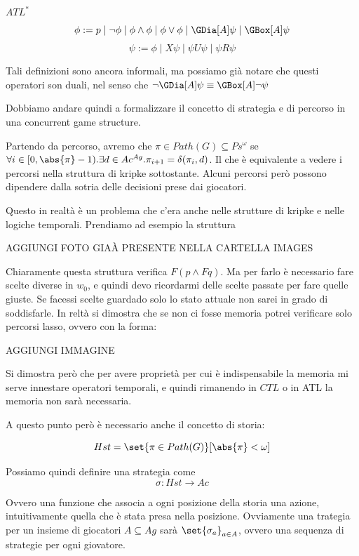 \begin{definition}{\(ATL^*\)}
  \[\phi := p \mid \neg \phi \mid \phi \land \phi \mid \phi \lor \phi \mid \GDia[A]\psi \mid \GBox[A] \psi\]
  \[\psi := \phi \mid X\psi \mid \psi U\psi \mid \psi R \psi\]


\end{definition}

Tali definizioni sono ancora informali, ma possiamo già notare che questi operatori son duali, nel senso che \(\neg \GDia[A]\psi \equiv \GBox[A] \neg \psi\)

Dobbiamo andare quindi a formalizzare il concetto di strategia e di percorso in una concurrent game structure.

Partendo da percorso, avremo che \(\pi \in Path(G) \subseteq Ps^\omega\) se \(\forall i \in [0,\abs{\pi}-1). \exists d \in Ac^{Ag}. \pi_{i+1} = \delta(\pi_i,d)\). Il che è equivalente a vedere i percorsi nella struttura di kripke sottostante. Alcuni percorsi però possono dipendere dalla sotria delle decisioni prese dai giocatori.

Questo in realtà è un problema che c'era anche nelle strutture di kripke e nelle logiche temporali. Prendiamo ad esempio la struttura

AGGIUNGI FOTO GIAÀ PRESENTE NELLA CARTELLA IMAGES

Chiaramente questa struttura verifica \(F(p\land Fq)\). Ma per farlo è necessario fare scelte diverse in \(w_0\), e quindi devo ricordarmi delle scelte passate per fare quelle giuste. Se facessi scelte guardado solo lo stato attuale non sarei in grado di soddisfarle. In reltà si dimostra che se non ci fosse memoria potrei verificare solo percorsi lasso, ovvero con la forma:

AGGIUNGI IMMAGINE

Si dimostra però che per avere proprietà per cui è indispensabile la memoria mi serve innestare operatori temporali, e quindi rimanendo in \(CTL\) o in ATL la memoria non sarà necessaria.

A questo punto però è necessario anche il concetto di storia:

\[Hst = \set{\pi \in Path(G)}[\abs{\pi} < \omega]\]

Possiamo quindi definire una strategia come
\[\sigma: Hst \to Ac\]

Ovvero una funzione che associa a ogni posizione della storia una azione, intuitivamente quella che è stata presa nella posizione.
Ovviamente una trategia per un insieme di giocatori \(A\subseteq Ag\) sarà \(\set{\sigma_a}_{a \in A}\), ovvero una sequenza di strategie per ogni giovatore.

